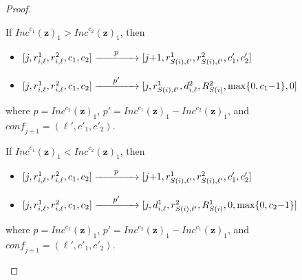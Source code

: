 \documentclass[a4paper,UKenglish,cleveref, autoref, thm-restate]{lipics-v2021}
\newcommand{\tran}[1]{\xrightarrow{\makebox[4em]{\footnotesize$#1$}}}
\newcommand{\INC}{\mathit{Inc}}
\renewcommand{\vec}[1]{\pmb{#1}}
\newcommand{\conf}{\textit{conf}}
\newcommand{\vv}[1]{\INC^{#1}(\vec{z})}
\begin{document}
\begin{proof}
\begin{itemize}
\begin{itemize}
        If $\vv{c_1}_1 > \vv{c_2}_1$, then
           \begin{itemize} 
            \item $[j,r^1_{i,\ell},r^2_{i,\ell},c_1,c_2] \tran{p}  [j{+}1,r^1_{S(i),\ell'},r^2_{S(i),\ell'},c'_1,c'_2]$
            \item $[j,r^1_{i,\ell},r^2_{i,\ell},c_1,c_2] \tran{p'}  [j,r^1_{S(i),\ell'},d^2_{i,\ell},R^2_{S(i)},\max\{0,c_1{-}1\},0]$
           \end{itemize}
        where $p = \vv{c_2}_1$, $p' =  \vv{c_1}_1 - \vv{c_2}_1$, and $\conf_{j+1}= (\ell',c'_1,c'_2)$.

        If $\vv{c_1}_1 < \vv{c_2}_1$, then
        \begin{itemize} 
            \item $[j,r^1_{i,\ell},r^2_{i,\ell},c_1,c_2] \tran{p}  [j{+}1,r^1_{S(i),\ell'},r^2_{S(i),\ell'},c'_1,c'_2]$
            \item $[j,r^1_{i,\ell},r^2_{i,\ell},c_1,c_2] \tran{p'}  [j,d^1_{i,\ell},r^2_{S(i),\ell'},R^1_{S(i)},0,\max\{0,c_2{-}1\}]$
           \end{itemize}
        where $p = \vv{c_1}_1$, $p' =  \vv{c_2}_1 - \vv{c_1}_1$, and $\conf_{j+1}= (\ell',c'_1,c'_2)$.


\end{itemize}
\end{itemize}
\end{proof}
\end{document}
